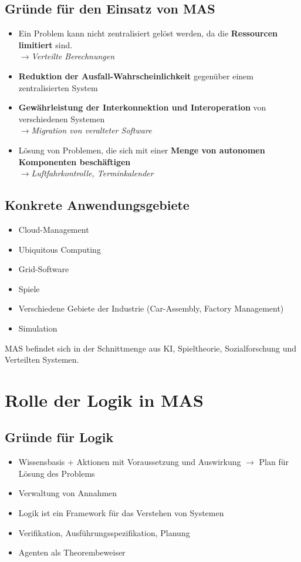 \documentclass{article} %
\begin{document}
	\subsection{Gründe für den Einsatz von MAS}
	\begin{itemize}
		\item Ein Problem kann nicht zentralisiert gelöst werden, da die \textbf{Ressourcen limitiert} sind.\\
		$\rightarrow$\textit{Verteilte Berechnungen}
		\item \textbf{Reduktion der Ausfall-Wahrscheinlichkeit} gegenüber einem zentralisierten System
		\item \textbf{Gewährleistung der Interkonnektion und Interoperation} von verschiedenen Systemen\\
		$\rightarrow$\textit{Migration von veralteter Software}
		\item Lösung von Problemen, die sich mit einer \textbf{ Menge von autonomen Komponenten beschäftigen}\\
		$\rightarrow$\textit{Luftfahrkontrolle, Terminkalender}
	\end{itemize}
	\subsection{Konkrete Anwendungsgebiete}
	\begin{itemize}
		\item Cloud-Management
		\item Ubiquitous Computing
		\item Grid-Software
		\item Spiele
		\item Verschiedene Gebiete der Industrie (Car-Assembly, Factory Management)
		\item Simulation
	\end{itemize}
	MAS befindet sich in der Schnittmenge aus KI, Spieltheorie, Sozialforschung und Verteilten Systemen.
\section{Rolle der Logik in MAS}
	\subsection{Gründe für Logik}
	\begin{itemize}
		\item Wissensbasis + Aktionen mit Voraussetzung und Auswirkung $\rightarrow$ Plan für Lösung des Problems
		\item Verwaltung von Annahmen
		\item Logik ist ein Framework für das Verstehen von Systemen
		\item Verifikation, Ausführungsspezifikation, Planung
		\item Agenten als Theorembeweiser
	\end{itemize}
\end{document}

